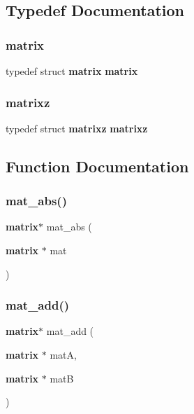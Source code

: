 \subsection{Typedef Documentation}
\mbox{\label{mat_lib_8h_a617664950923f06d9e397392b30e69f1}} 
\subsubsection{matrix}
{\footnotesize\ttfamily typedef struct \textbf{ matrix}  \textbf{ matrix}}

\mbox{\label{mat_lib_8h_a30f41c0bdf6b4125dc0586d937385799}} 
\subsubsection{matrixz}
{\footnotesize\ttfamily typedef struct \textbf{ matrixz}  \textbf{ matrixz}}



\subsection{Function Documentation}
\mbox{\label{mat_lib_8h_a0a5fd6c01460d9a35948f55625a00c80}} 
\subsubsection{mat\+\_\+abs()}
{\footnotesize\ttfamily \textbf{ matrix}$\ast$ mat\+\_\+abs (\begin{DoxyParamCaption}\item[{\textbf{ matrix} $\ast$}]{mat }\end{DoxyParamCaption})}

\mbox{\label{mat_lib_8h_a5af0cd9e14323237bfaa06a13bb8c3b3}} 
\subsubsection{mat\+\_\+add()}
{\footnotesize\ttfamily \textbf{ matrix}$\ast$ mat\+\_\+add (\begin{DoxyParamCaption}\item[{\textbf{ matrix} $\ast$}]{matA,  }\item[{\textbf{ matrix} $\ast$}]{matB }\end{DoxyParamCaption})}

